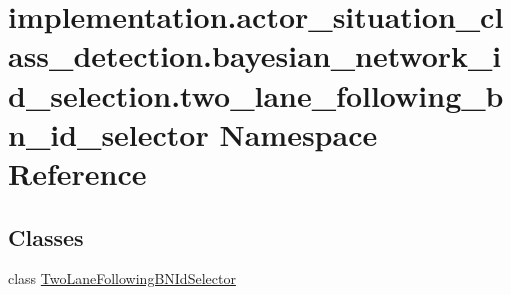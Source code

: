 \hypertarget{namespaceimplementation_1_1actor__situation__class__detection_1_1bayesian__network__id__selectio32bdc68987338a8f52088e6b77ed8f46}{}\section{implementation.\+actor\+\_\+situation\+\_\+class\+\_\+detection.\+bayesian\+\_\+network\+\_\+id\+\_\+selection.\+two\+\_\+lane\+\_\+following\+\_\+bn\+\_\+id\+\_\+selector Namespace Reference}
\label{namespaceimplementation_1_1actor__situation__class__detection_1_1bayesian__network__id__selectio32bdc68987338a8f52088e6b77ed8f46}
\subsection*{Classes}
\begin{DoxyCompactItemize}
\item 
class \hyperlink{classimplementation_1_1actor__situation__class__detection_1_1bayesian__network__id__selection_1_ad1cbe3342f1a4b96bc86989d1def5fb}{Two\+Lane\+Following\+B\+N\+Id\+Selector}
\end{DoxyCompactItemize}
